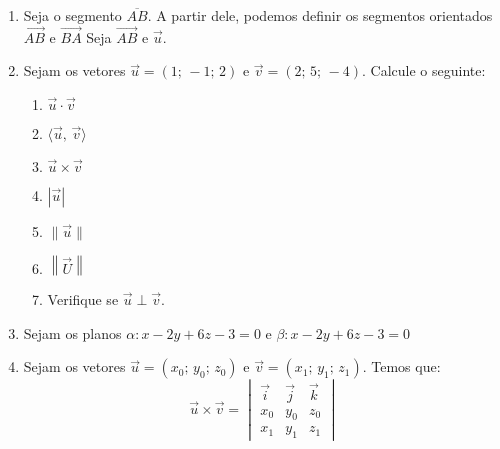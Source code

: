 \documentclass[a4paper, 12pt]{article}
\begin{document}
\begin{enumerate}
    \item Seja o segmento $\overline{AB}$. %
    A partir dele, podemos definir os segmentos orientados $\overrightarrow{AB}$ e $\overrightarrow{BA}$ %
    Seja $\vec{AB}$ e $\vec{u}$. %
    
    \item Sejam os vetores $\vec{u} = (1; \, -1 ;\, 2)$ e $\vec{v} = (2; \, 5 ;\, -4)$. Calcule o seguinte:
    
    \begin{enumerate}
        \item $\vec{u} \cdot \vec{v}$ %
        \item $\langle \vec{u}, \, \vec{v}\rangle$ %
        \item $\vec{u} \times \vec{v}$ %
        \item $|\vec{u}|$ %
        \item $\|\vec{u}\|$ %
        \item $\left\|\vec{U}\right\|$ %
        \item Verifique se $\vec{u} \perp \vec{v}$. %
    \end{enumerate}
     
    \item Sejam os planos $\alpha : x - 2y + 6z - 3 = 0$ e $\beta : x - 2y + 6z - 3 = 0$ %
    
    \item Sejam os vetores $\vec{u} = (x_0; \, y_0 ; \, z_0)$ e $\vec{v} = (x_1; \, y_1 ; \, z_1)$. Temos que:
    $$
    \vec{u} \times \vec{v}= 
    \begin{vmatrix}
        \vec{i} & \vec{j} & \vec{k} \\
        x_0 & y_0 & z_0 \\
        x_1 & y_1 & z_1
    \end{vmatrix}
    $$
\end{enumerate}
\end{document}
